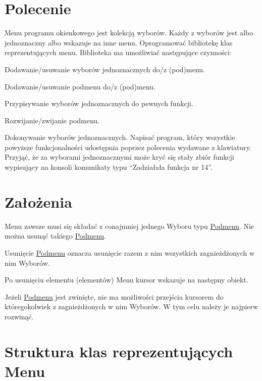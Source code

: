 \section*{Polecenie}

Menu programu okienkowego jest kolekcją wyborów. Każdy z wyborów jest albo jednoznaczny albo wskazuje na inne menu. Oprogramować bibliotekę klas reprezentujących menu. Biblioteka ma umożliwiać następujące czynności\-:
\begin{DoxyItemize}
\item Dodawanie/usuwanie wyborów jednoznacznych do/z (pod)menu.
\item Dodawanie/usuwanie podmenu do/z (pod)menu.
\item Przypisywanie wyborów jednoznacznych do pewnych funkcji.
\item Rozwijanie/zwijanie podmenu.
\item Dokonywanie wyborów jednoznacznych. Napisać program, który wszystkie powyższe funkcjonalności udostępnia poprzez polecenia wydawane z klawiatury. Przyjąć, że za wyborami jednoznacznymi może kryć się stały zbiór funkcji wypisujący na konsoli komunikaty typu “\-Zadziałała funkcja nr 14”.
\end{DoxyItemize}

\section*{Założenia}


\begin{DoxyEnumerate}
\item Menu zawsze musi się składać z conajmniej jednego Wyboru typu \hyperlink{classPodmenu}{Podmenu}. Nie można usunąć takiego \hyperlink{classPodmenu}{Podmenu}.
\item Usunięcie \hyperlink{classPodmenu}{Podmenu} oznacza usunięcie razem z nim wszystkich zagnieżdżonych w nim Wyborów.
\item Po usunięciu elementu (elementów) Menu kursor wskazuje na następny obiekt.
\item Jeżeli \hyperlink{classPodmenu}{Podmenu} jest zwinięte, nie ma możliwości przejścia kursorem do któregokolwiek z zagnieżdżonych w nim Wyborów. W tym celu należy je najpierw rozwinąć.
\end{DoxyEnumerate}

\section*{Struktura klas reprezentujących Menu}

